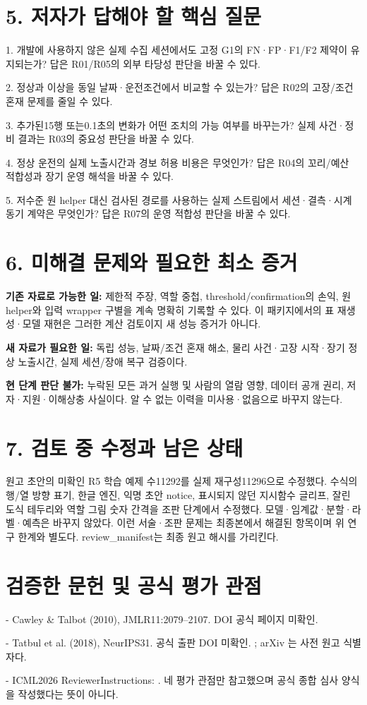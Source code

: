 \documentclass[11pt,a4paper]{article}
\begin{document}
\section*{5. 저자가 답해야 할 핵심 질문}
1. 개발에 사용하지 않은 실제 수집 세션에서도 고정 G1의 FN·FP·F1/F2 제약이 유지되는가? 답은 R01/R05의 외부 타당성 판단을 바꿀 수 있다.\par
2. 정상과 이상을 동일 날짜·운전조건에서 비교할 수 있는가? 답은 R02의 고장/조건 혼재 문제를 줄일 수 있다.\par
3. 추가된15행 또는0.1초의 변화가 어떤 조치의 가능 여부를 바꾸는가? 실제 사건·정비 결과는 R03의 중요성 판단을 바꿀 수 있다.\par
4. 정상 운전의 실제 노출시간과 경보 허용 비용은 무엇인가? 답은 R04의 꼬리/예산 적합성과 장기 운영 해석을 바꿀 수 있다.\par
5. 저수준 원 helper 대신 검사된 경로를 사용하는 실제 스트림에서 세션·결측·시계 동기 계약은 무엇인가? 답은 R07의 운영 적합성 판단을 바꿀 수 있다.\par
\section*{6. 미해결 문제와 필요한 최소 증거}
\textbf{기존 자료로 가능한 일:} 제한적 주장, 역할 중첩, threshold/confirmation의 손익, 원 helper와 입력 wrapper 구별을 계속 명확히 기록할 수 있다. 이 패키지에서의 표 재생성·모델 재현은 그러한 계산 검토이지 새 성능 증거가 아니다.\par
\textbf{새 자료가 필요한 일:} 독립 성능, 날짜/조건 혼재 해소, 물리 사건·고장 시작·장기 정상 노출시간, 실제 세션/장애 복구 검증이다.\par
\textbf{현 단계 판단 불가:} 누락된 모든 과거 실행 및 사람의 열람 영향, 데이터 공개 권리, 저자·지원·이해상충 사실이다. 알 수 없는 이력을 미사용·없음으로 바꾸지 않는다.\par
\section*{7. 검토 중 수정과 남은 상태}
원고 초안의 미확인 R5 학습 예제 수11292를 실제 재구성11296으로 수정했다. 수식의 행/열 방향 표기, 한글 엔진, 익명 초안 notice, 표시되지 않던 지시함수 글리프, 잘린 도식 테두리와 역할 그림 숫자 간격을 조판 단계에서 수정했다. 모델·임계값·분할·라벨·예측은 바꾸지 않았다. 이런 서술·조판 문제는 최종본에서 해결된 항목이며 위 연구 한계와 별도다. review\_manifest는 최종 원고 해시를 가리킨다.\par
\section*{검증한 문헌 및 공식 평가 관점}
- Cawley \& Talbot (2010), JMLR11:2079–2107. DOI 공식 페이지 미확인. \par
- Tatbul et al. (2018), NeurIPS31. 공식 출판 DOI 미확인.  ; arXiv 는 사전 원고 식별자다.\par
- ICML2026 ReviewerInstructions:  . 네 평가 관점만 참고했으며 공식 종합 심사 양식을 작성했다는 뜻이 아니다.\par
\end{document}
